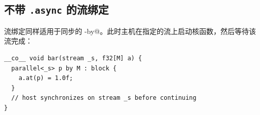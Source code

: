 \subsection*{不带 \texttt{.async} 的流绑定}

流绑定同样适用于同步的 \co@parallel-by@。此时主机在指定的流上启动核函数，然后等待该流完成：

\begin{lstlisting}[language=croqtile,caption={不带 .async 的流绑定}]
__co__ void bar(stream _s, f32[M] a) {
  parallel<_s> p by M : block {
    a.at(p) = 1.0f;
  }
  // host synchronizes on stream _s before continuing
}
\end{lstlisting}
